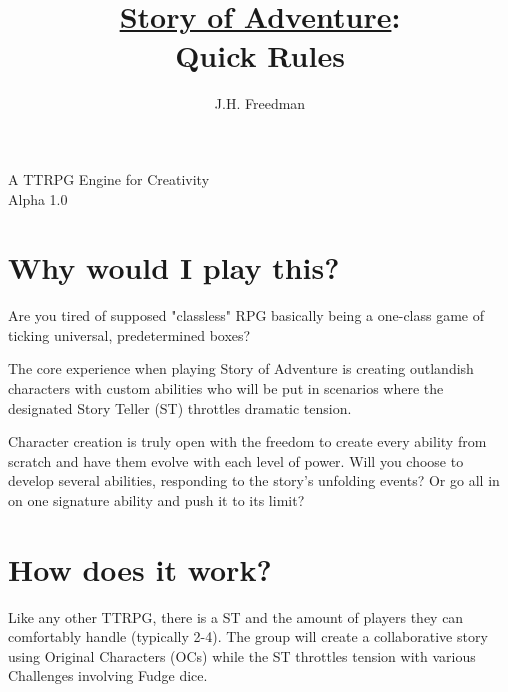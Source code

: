 \documentclass[statementpaper,oneside,article,12pt]{memoir}
\newcommand{\BackgroundPic}[1]{%
	\put(0,0){%
		\parbox[b][\paperheight]{\paperwidth}{%
			\vfill
			\centering
			{\transparent{0.4} \texttt{[image: \#1]}}%
			\vfill
}}}
\begin{document}
	
	
	\title{\underline{Story of Adventure}:\\Quick Rules}
	\author{J.H. Freedman}
	\date{}
	
	\begingroup
	\let\cleardoublepage\clearpage
	
	
	\begin{titlingpage}
		\maketitle
		
		A TTRPG Engine for Creativity\\Alpha 1.0
		
	\end{titlingpage}
	
	\endgroup
	
	\pagestyle{empty}
	
	
	
	\section*{Why would I play this?}
	Are you tired of supposed "classless" RPG basically being a one-class game of ticking universal, predetermined boxes?
	
	The core experience when playing Story of Adventure is creating outlandish characters with custom abilities who will be put in scenarios where the designated Story Teller (ST) throttles dramatic tension.
	
	Character creation is truly open with the freedom to create every ability from scratch and have them evolve with each level of power. Will you choose to develop several abilities, responding to the story's unfolding events? Or go all in on one signature ability and push it to its limit?
	
	\section*{How does it work?}
	Like any other TTRPG, there is a ST and the amount of players they can comfortably handle (typically 2-4). The group will create a collaborative story using Original Characters (OCs) while the ST throttles tension with various Challenges involving Fudge dice.
	
\end{document}
